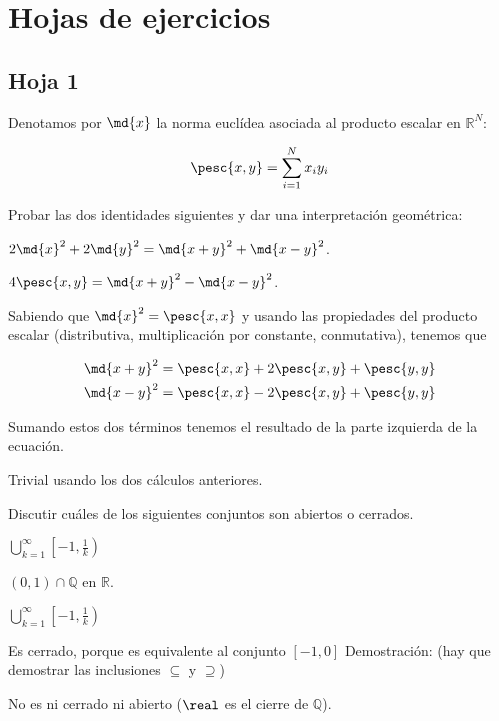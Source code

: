 \section{Hojas de ejercicios}

\subsection{Hoja 1}

\begin{problem}[1] Denotamos por $\md{x}$ la norma euclídea asociada al producto escalar en $ℝ^N$:

\[ \pesc{x,y} = \sum_{i=1}^Nx_iy_i \]

Probar las dos identidades siguientes y dar una interpretación geométrica:

\ppart $2\md{x}^2 + 2\md{y}^2 = \md{x+y}^2 + \md{x-y}^2$.

\ppart $4\pesc{x,y} = \md{x+y}^2 - \md{x-y}^2$.

\solution

\spart Sabiendo que $\md{x}^2 = \pesc{x,x}$ y usando las propiedades del producto escalar (distributiva, multiplicación por constante, conmutativa), tenemos que 

\begin{gather*}
\md{x+y}^2 = \pesc{x,x} + 2\pesc{x,y} + \pesc{y,y} \\ 
\md{x-y}^2 = \pesc{x,x} - 2\pesc{x,y} + \pesc{y,y} 
\end{gather*}

Sumando estos dos términos tenemos el resultado de la parte izquierda de la ecuación.

\spart Trivial usando los dos cálculos anteriores.

\end{problem}

\begin{problem}[3] Discutir cuáles de los siguientes conjuntos son abiertos o cerrados.

\ppart $\displaystyle\bigcup_{k=1}^{\infty} \left[-1,\frac{1}{k}\right)$

\ppart $(0,1)\cap ℚ$ en $ℝ$.
\solution

\spart

$\displaystyle\bigcup_{k=1}^{\infty} \left[-1,\frac{1}{k}\right)$

Es cerrado, porque es equivalente al conjunto $[-1,0]$
Demostración: (hay que demostrar las inclusiones $\subseteq$ y $\supseteq$)

\spart
No es ni cerrado ni abierto ($\real$ es el cierre de $\mathbb{Q}$).
 
\end{problem}



